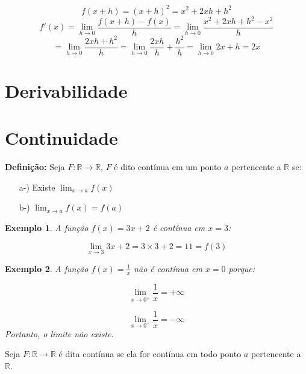 \documentclass{book}
\numberwithin{defn}{chapter}
\newtheorem{exe}{Exemplo}
\numberwithin{exe}{chapter}
\numberwithin{ex}{chapter}
\numberwithin{obs}{chapter}
\numberwithin{fato}{chapter}
\numberwithin{resp}{chapter}
\begin{document}
\[f(x+h) = (x+h)^2 = x^2 + 2xh + h^2\]
\[f'(x) = \lim_{h \to 0} \frac{f(x+h) - f(x)}{h} = \lim_{h \to 0} \frac{x^2 + 2xh + h^2 - x^2}{h}\]
\[= \lim_{h \to 0} \frac{2xh + h^2}{h} = \lim_{h \to 0} \frac{2xh}{h} + \frac{h^2}{h} = \lim_{h \to 0} 2x + h = 2x\]




\section{Derivabilidade} %
\section{Continuidade} %
\textbf{Definição:} Seja \( F: \mathbb{R} \rightarrow \mathbb{R} \), \( F \) é dito contínua em um ponto \( a \) pertencente a \( \mathbb{R} \) se:

\begin{itemize}
    \item[a-)] Existe \( \lim_{x \to a} f(x) \)
    \item[b-)] \( \lim_{x \to a} f(x) = f(a) \)
\end{itemize}

\begin{exe} A função \( f(x) = 3x + 2 \) é contínua em \( x = 3 \):

\[
\lim_{x \to 3} 3x + 2 = 3 \times 3 + 2 = 11 = f(3)
\]
\end{exe}

\begin{exe} A função \( f(x) = \frac{1}{x} \) não é contínua em \( x = 0 \) porque:

\[
\lim_{x \to 0^+} \frac{1}{x} = +\infty
\]

\[
\lim_{x \to 0^-} \frac{1}{x} = -\infty
\]
Portanto, o limite não existe.
\end{exe}

\noindent Seja \( F: \mathbb{R} \rightarrow \mathbb{R} \) é dita contínua se ela for contínua em todo ponto \( a \) pertencente a \( \mathbb{R} \).
\end{document}

